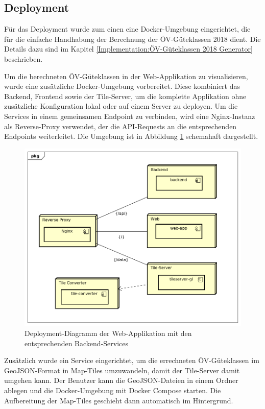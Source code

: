 \subsection{Deployment}
\label{Infrastruktur:Deployment}

Für das Deployment wurde zum einen eine Docker-Umgebung eingerichtet, die für die einfache Handhabung der Berechnung der \acs{ÖV}-Güteklassen 2018 dient.
Die Details dazu sind im Kapitel \ref{Implementation:ÖV-Güteklassen 2018 Generator} beschrieben.

Um die berechneten \acs{ÖV}-Güteklassen in der Web-Applikation zu visualisieren, wurde eine zusätzliche Docker-Umgebung vorbereitet.
Diese kombiniert das Backend, Frontend sowie der Tile-Server, um die komplette Applikation ohne zusätzliche Konfiguration lokal oder auf einem Server zu deployen.
Um die Services in einem gemeinsamen Endpoint zu verbinden, wird eine Nginx-Instanz als Reverse-Proxy verwendet, der die \acs{API}-Requests an die entsprechenden Endpoints weiterleitet.
Die Umgebung ist in Abbildung \ref{fig:deployment_web-app} schemahaft dargestellt.

\begin{figure}[ht]
    \centering
    \includegraphics[width=0.6\linewidth]{projectdoc/img/deployment_web-app}
    \caption[Deployment-Diagramm der Web-Applikation]{Deployment-Diagramm der Web-Applikation mit den entsprechenden Backend-Services}
    \label{fig:deployment_web-app}
\end{figure}

Zusätzlich wurde ein Service eingerichtet, um die errechneten \acs{ÖV}-Güteklassen im GeoJSON-Format in Map-Tiles umzuwandeln, damit der Tile-Server damit umgehen kann.
Der Benutzer kann die GeoJSON-Dateien in einem Ordner ablegen und die Docker-Umgebung mit Docker Compose starten.
Die Aufbereitung der Map-Tiles geschieht dann automatisch im Hintergrund.